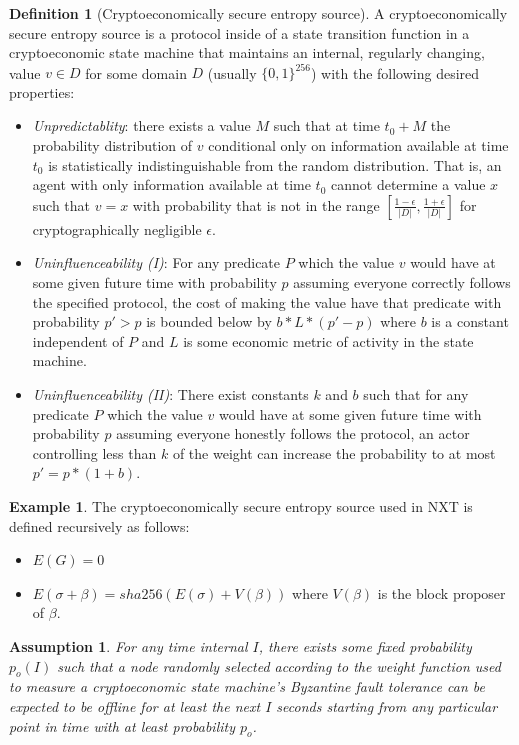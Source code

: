 \documentclass[11pt,a4paper]{report}
\theoremstyle{plain}
\newtheorem{assm}{Assumption}[chapter]
\theoremstyle{definition}
\newtheorem{defn}{Definition}[chapter]
\newtheorem{exmp}{Example}[section]
\theoremstyle{remark}
\begin{document}
\begin{defn}[Cryptoeconomically secure entropy source]
A cryptoeconomically secure entropy source is a protocol inside of a state transition function in a cryptoeconomic state machine that maintains an internal, regularly changing, value $v \in D$ for some domain $D$ (usually $\{0,1\}^{256}$) with the following desired properties:
\begin{itemize}
\item \emph{Unpredictablity}: there exists a value $M$ such that at time $t_0 + M$ the probability distribution of $v$ conditional only on information available at time $t_0$ is statistically indistinguishable from the random distribution. That is, an agent with only information available at time $t_0$ cannot determine a value $x$ such that $v = x$ with probability that is not in the range $[\frac{1 - \epsilon}{|D|}, \frac{1 + \epsilon}{|D|}]$ for cryptographically negligible $\epsilon$.
\item \emph{Uninfluenceability (I)}: For any predicate $P$ which the value $v$ would have at some given future time with probability $p$ assuming everyone correctly follows the specified protocol, the cost of making the value have that predicate with probability $p' > p$ is bounded below by $b * L * (p' - p)$ where $b$ is a constant independent of $P$ and $L$ is some economic metric of activity in the state machine.
\item \emph{Uninfluenceability (II)}: There exist constants $k$ and $b$ such that for any predicate $P$ which the value $v$ would have at some given future time with probability $p$ assuming everyone honestly follows the protocol, an actor controlling less than $k$ of the weight can increase the probability to at most $p' = p * (1 + b)$.
\end{itemize}
\end{defn}

\begin{exmp}
The cryptoeconomically secure entropy source used in NXT \citep{nxt_community_nxt_2014} is defined recursively as follows:
\begin{itemize}
\item
$E(G) = 0$
\item 
$E(\sigma + \beta) = sha256(E(\sigma) + V(\beta))$ where $V(\beta)$ is the block proposer of $\beta$.
\end{itemize}
\end{exmp}

\begin{assm}
For any time internal $I$, there exists some fixed probability $p_o(I)$ such that a node randomly selected according to the weight function used to measure a cryptoeconomic state machine's Byzantine fault tolerance can be expected to be offline for at least the next $I$ seconds starting from any particular point in time with at least probability $p_o$.
\end{assm}
\end{document}

